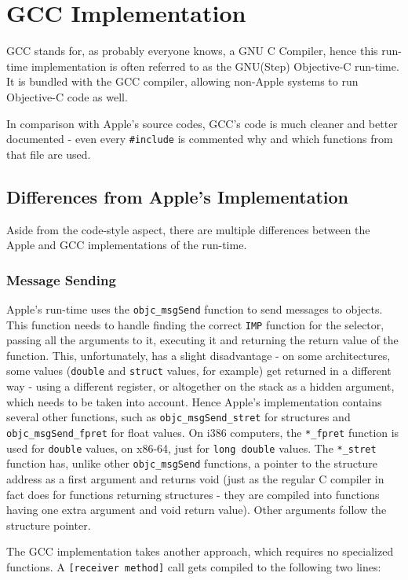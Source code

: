 \chapter{GCC Implementation}

GCC stands for, as probably everyone knows, a GNU C Compiler, hence this run-time implementation is often referred to as the GNU(Step) Objective-C run-time. It is bundled with the GCC compiler, allowing non-Apple systems to run Objective-C code as well.

In comparison with Apple's source codes, GCC's code is much cleaner and better documented - even every \verb=#include= is commented why and which functions from that file are used.

\section{Differences from Apple's Implementation}

Aside from the code-style aspect, there are multiple differences between the Apple and GCC implementations of the run-time.

\subsection{Message Sending}
Apple's run-time uses the \verb=objc_msgSend= function to send messages to objects. This function needs to handle finding the correct \verb=IMP= function for the selector, passing all the arguments to it, executing it and returning the return value of the function. This, unfortunately, has a slight disadvantage - on some architectures, some values (\verb=double= and \verb=struct= values, for example) get returned in a different way - using a different register, or altogether on the stack as a hidden argument, which needs to be taken into account. Hence Apple's implementation contains several other functions, such as \verb=objc_msgSend_stret= for structures and \verb=objc_msgSend_fpret= for float values. On i386 computers, the \verb=*_fpret= function is used for \verb=double= values, on x86-64, just for \verb=long double= values. The \verb=*_stret= function has, unlike other \verb=objc_msgSend= functions, a pointer to the structure address as a first argument and returns void (just as the regular C compiler in fact does for functions returning structures - they are compiled into functions having one extra argument and void return value). Other arguments follow the structure pointer.

The GCC implementation takes another approach, which requires no specialized functions. A \verb=[receiver method]= call gets compiled to the following two lines:

